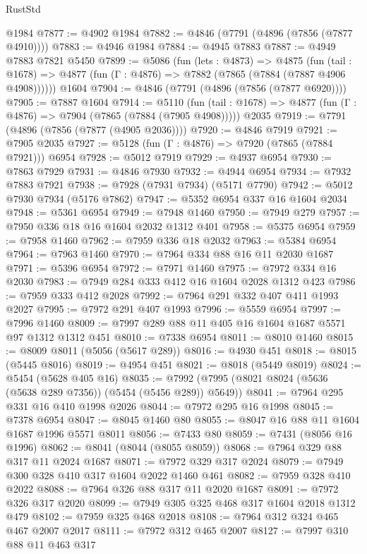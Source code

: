 \begin{lexlean}{RustStd}
\begin{coremodule}
    @1984
@7877 := @4902 @1984
@7882 := @4846 (@7791 (@4896 (@7856 (@7877 @4910))))
@7883 := @4946 @1984
@7884 := @4945 @7883
@7887 := @4949 @7883 @7821 @5450
@7899 := @5086
    (fun (lets : @4873) =>
    @4875
      (fun (tail : @1678) => @4877 (fun (Γ : @4876) => @7882 (@7865 (@7884 (@7887 @4906 @4908))))))
    @1604
@7904 := @4846 (@7791 (@4896 (@7856 (@7877 @6920))))
@7905 := @7887 @1604
@7914 := @5110
    (fun (tail : @1678) => @4877 (fun (Γ : @4876) => @7904 (@7865 (@7884 (@7905 @4908)))))
    @2035
@7919 := @7791 (@4896 (@7856 (@7877 (@4905 @2036))))
@7920 := @4846 @7919
@7921 := @7905 @2035
@7927 := @5128 (fun (Γ : @4876) => @7920 (@7865 (@7884 @7921))) @6954
@7928 := @5012 @7919
@7929 := @4937 @6954
@7930 := @7863 @7929
@7931 := @4846 @7930
@7932 := @4944 @6954
@7934 := @7932 @7883 @7921
@7938 := @7928 (@7931 @7934) (@5171 @7790)
@7942 := @5012 @7930 @7934 (@5176 @7862)
@7947 := @5352 @6954 @337 @16 @1604 @2034
@7948 := @5361 @6954
@7949 := @7948 @1460
@7950 := @7949 @279
@7957 := @7950 @336 @18 @16 @1604 @2032 @1312 @401
@7958 := @5375 @6954
@7959 := @7958 @1460
@7962 := @7959 @336 @18 @2032
@7963 := @5384 @6954
@7964 := @7963 @1460
@7970 := @7964 @334 @88 @16 @11 @2030 @1687
@7971 := @5396 @6954
@7972 := @7971 @1460
@7975 := @7972 @334 @16 @2030
@7983 := @7949 @284 @333 @412 @16 @1604 @2028 @1312 @423
@7986 := @7959 @333 @412 @2028
@7992 := @7964 @291 @332 @407 @411 @1993 @2027
@7995 := @7972 @291 @407 @1993
@7996 := @5559 @6954
@7997 := @7996 @1460
@8009 := @7997 @289 @88 @11 @405 @16 @1604 @1687 @5571 @97 @1312 @1312 @451
@8010 := @7338 @6954
@8011 := @8010 @1460
@8015 := @8009 @8011 (@5056 (@5617 @289))
@8016 := @4930 @451
@8018 := @8015 (@5445 @8016)
@8019 := @4954 @451
@8021 := @8018 (@5449 @8019)
@8024 := @5454 (@5628 @405 @16)
@8035 := @7992 (@7995 (@8021 @8024 (@5636 (@5638 @289 @7356)) (@5454 (@5456 @289)) @5649))
@8041 := @7964 @295 @331 @16 @410 @1998 @2026
@8044 := @7972 @295 @16 @1998
@8045 := @7378 @6954
@8047 := @8045 @1460 @80
@8055 := @8047 @16 @88 @11 @1604 @1687 @1996 @5571 @8011
@8056 := @7433 @80
@8059 := @7431 (@8056 @16 @1996)
@8062 := @8041 (@8044 (@8055 @8059))
@8068 := @7964 @329 @88 @317 @11 @2024 @1687
@8071 := @7972 @329 @317 @2024
@8079 := @7949 @300 @328 @410 @317 @1604 @2022 @1460 @461
@8082 := @7959 @328 @410 @2022
@8088 := @7964 @326 @88 @317 @11 @2020 @1687
@8091 := @7972 @326 @317 @2020
@8099 := @7949 @305 @325 @468 @317 @1604 @2018 @1312 @479
@8102 := @7959 @325 @468 @2018
@8108 := @7964 @312 @324 @465 @467 @2007 @2017
@8111 := @7972 @312 @465 @2007
@8127 := @7997
    @310
    @88
    @11
    @463
    @317

\end{coremodule}
\end{lexlean}
